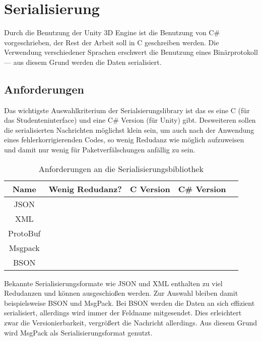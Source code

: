 \clearpage
\section{Serialisierung}
Durch die Benutzung der Unity 3D Engine ist die Benutzung von C\# vorgeschrieben, der Rest der Arbeit soll in C geschreiben werden. Die Verwendung verschiedener Sprachen erschwert die Benutzung eines
Bin{\"{a}}rprotokoll --- aus diesem Grund werden die Daten serialisiert.

\subsection{Anforderungen}
Das wichtigste Auswahlkriterium der Serialsierungslibrary ist das es eine C (f{\"{u}}r das Studenteninterface) und eine C\# Version (f{\"{u}}r Unity) gibt.
Desweiteren sollen die serialisierten Nachrichten m{\"{o}}glichst klein sein, um auch nach der Anwendung
eines fehlerkorrigierenden Codes, so wenig Redudanz wie m{\"{o}}glich aufzuweisen und damit nur wenig f{\"{u}}r Paketverf{\"{a}}lschungen anf{\"{a}}llig zu sein.

\begin{table}[h]
\centering
\begin{tabu}{c | c | c | c | p{5cm}}
	\toprule
	Name & Wenig Redudanz? & C Version & C\# Version \\
	\midrule
	JSON & \xmark & \checkmark & \checkmark \\
	XML & \xmark & \checkmark & \checkmark \\
	ProtoBuf & \checkmark & \xmark\footnotemark & \checkmark \\
	Msgpack\cite{msgpack} & \checkmark & \checkmark & \checkmark \\
	BSON & \checkmark & \checkmark & \checkmark \\
	\bottomrule
\end{tabu}
\caption{Anforderungen an die Serialisierungsbibliothek}
\end{table}

Bekannte Serialisierungsformate wie JSON und XML enthalten zu viel Redudanzen und k{\"{o}}nnen ausgeschio{\ss}en werden. Zur Auswahl bleiben damit beispielsweise BSON und MsgPack.
Bei BSON werden die Daten an sich effizient serialisiert, allerdings wird immer der Feldname mitgesendet. Dies erleichtert zwar die Versionierbarkeit, vergr{\"{o}}{\ss}ert
die Nachricht allerdings. Aus diesem Grund wird MsgPack als Serialisierungsformat genutzt.

